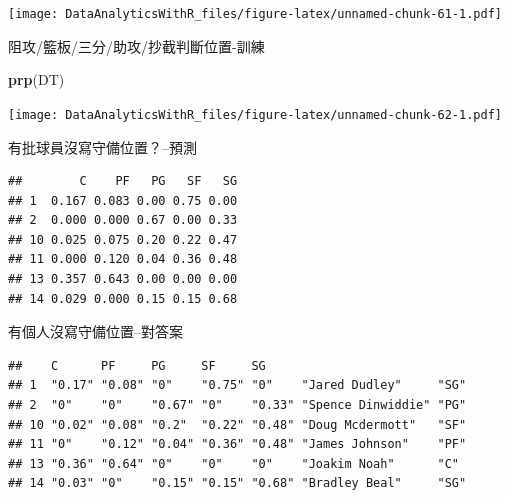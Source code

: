 \documentclass[]{book}
\newenvironment{Shaded}{\begin{snugshade}}{\end{snugshade}}
\newcommand{\CommentTok}[1]{\textcolor[rgb]{0.56,0.35,0.01}{\textit{#1}}}
\newcommand{\DataTypeTok}[1]{\textcolor[rgb]{0.13,0.29,0.53}{#1}}
\newcommand{\DecValTok}[1]{\textcolor[rgb]{0.00,0.00,0.81}{#1}}
\newcommand{\KeywordTok}[1]{\textcolor[rgb]{0.13,0.29,0.53}{\textbf{#1}}}
\newcommand{\NormalTok}[1]{#1}
\newcommand{\OperatorTok}[1]{\textcolor[rgb]{0.81,0.36,0.00}{\textbf{#1}}}
\begin{document}
\texttt{[image: DataAnalyticsWithR\_files/figure-latex/unnamed-chunk-61-1.pdf]}

阻攻/籃板/三分/助攻/抄截判斷位置-訓練

\begin{Shaded}
\begin{Highlighting}[]
\KeywordTok{prp}\NormalTok{(DT)}
\end{Highlighting}
\end{Shaded}

\texttt{[image: DataAnalyticsWithR\_files/figure-latex/unnamed-chunk-62-1.pdf]}

有批球員沒寫守備位置？--預測

\begin{Shaded}
\end{Shaded}

\begin{verbatim}
##        C    PF   PG   SF   SG
## 1  0.167 0.083 0.00 0.75 0.00
## 2  0.000 0.000 0.67 0.00 0.33
## 10 0.025 0.075 0.20 0.22 0.47
## 11 0.000 0.120 0.04 0.36 0.48
## 13 0.357 0.643 0.00 0.00 0.00
## 14 0.029 0.000 0.15 0.15 0.68
\end{verbatim}

有個人沒寫守備位置--對答案

\begin{Shaded}
\end{Shaded}

\begin{verbatim}
##    C      PF     PG     SF     SG                            
## 1  "0.17" "0.08" "0"    "0.75" "0"    "Jared Dudley"     "SG"
## 2  "0"    "0"    "0.67" "0"    "0.33" "Spence Dinwiddie" "PG"
## 10 "0.02" "0.08" "0.2"  "0.22" "0.48" "Doug Mcdermott"   "SF"
## 11 "0"    "0.12" "0.04" "0.36" "0.48" "James Johnson"    "PF"
## 13 "0.36" "0.64" "0"    "0"    "0"    "Joakim Noah"      "C" 
## 14 "0.03" "0"    "0.15" "0.15" "0.68" "Bradley Beal"     "SG"
\end{verbatim}
\end{document}
